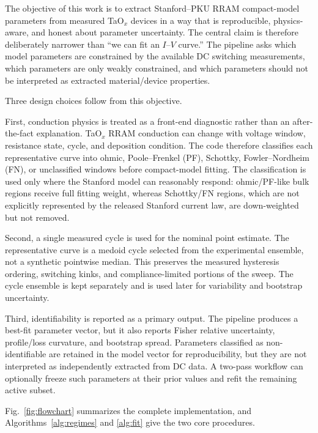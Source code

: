 \documentclass[journal]{IEEEtran}
\begin{document}
The objective of this work is to extract Stanford--PKU RRAM compact-model
parameters from measured TaO$_x$ devices in a way that is reproducible,
physics-aware, and honest about parameter uncertainty.  The central claim is
therefore deliberately narrower than ``we can fit an $I$--$V$ curve.''  The
pipeline asks which model parameters are constrained by the available DC
switching measurements, which parameters are only weakly constrained, and
which parameters should not be interpreted as extracted material/device
properties.

Three design choices follow from this objective.

First, conduction physics is treated as a front-end diagnostic rather than an
after-the-fact explanation.  TaO$_x$ RRAM conduction can change with voltage
window, resistance state, cycle, and deposition condition.  The code therefore
classifies each representative curve into ohmic, Poole--Frenkel (PF),
Schottky, Fowler--Nordheim (FN), or unclassified windows before compact-model
fitting.  The classification is used only where the Stanford model can
reasonably respond: ohmic/PF-like bulk regions receive full fitting weight,
whereas Schottky/FN regions, which are not explicitly represented by the
released Stanford current law, are down-weighted but not removed.

Second, a single measured cycle is used for the nominal point estimate.  The
representative curve is a medoid cycle selected from the experimental ensemble,
not a synthetic pointwise median.  This preserves the measured hysteresis
ordering, switching kinks, and compliance-limited portions of the sweep.  The
cycle ensemble is kept separately and is used later for variability and
bootstrap uncertainty.

Third, identifiability is reported as a primary output.  The pipeline produces
a best-fit parameter vector, but it also reports Fisher relative uncertainty,
profile/loss curvature, and bootstrap spread.  Parameters classified as
non-identifiable are retained in the model vector for reproducibility, but
they are not interpreted as independently extracted from DC data.  A two-pass
workflow can optionally freeze such parameters at their prior values and refit
the remaining active subset.

Fig.~\ref{fig:flowchart} summarizes the complete implementation, and
Algorithms~\ref{alg:regimes} and \ref{alg:fit} give the two core procedures.

\end{document}
